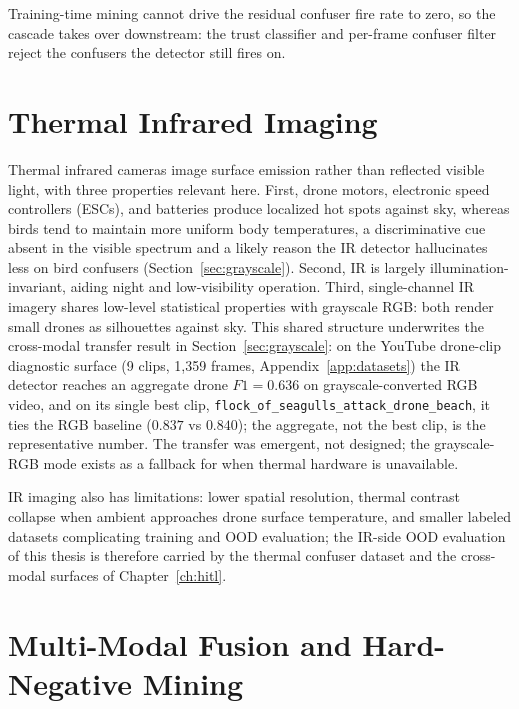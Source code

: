 Training-time mining cannot drive the residual confuser fire rate to zero, so the cascade takes over downstream: the trust classifier and per-frame confuser filter reject the confusers the detector still fires on.

\section{Thermal Infrared Imaging}
\label{sec:lit_ir}

Thermal infrared cameras image surface emission rather than reflected visible light, with three properties relevant here. First, drone motors, electronic speed controllers (ESCs), and batteries produce localized hot spots against sky, whereas birds tend to maintain more uniform body temperatures, a discriminative cue absent in the visible spectrum and a likely reason the IR detector hallucinates less on bird confusers (Section~\ref{sec:grayscale}). Second, IR is largely illumination-invariant, aiding night and low-visibility operation. Third, single-channel IR imagery shares low-level statistical properties with grayscale RGB: both render small drones as silhouettes against sky. This shared structure underwrites the cross-modal transfer result in Section~\ref{sec:grayscale}: on the YouTube drone-clip diagnostic surface (9 clips, 1{,}359 frames, Appendix~\ref{app:datasets}) the IR detector reaches an aggregate drone $F1=0.636$ on grayscale-converted RGB video, and on its single best clip, \texttt{flock\_of\_seagulls\_attack\_drone\_beach}, it ties the RGB baseline ($0.837$ vs $0.840$); the aggregate, not the best clip, is the representative number. The transfer was emergent, not designed; the grayscale-RGB mode exists as a fallback for when thermal hardware is unavailable.

IR imaging also has limitations: lower spatial resolution, thermal contrast collapse when ambient approaches drone surface temperature, and smaller labeled datasets complicating training and OOD evaluation; the IR-side OOD evaluation of this thesis is therefore carried by the thermal confuser dataset and the cross-modal surfaces of Chapter~\ref{ch:hitl}.

\section{Multi-Modal Fusion and Hard-Negative Mining}
\label{sec:lit_fusion}

